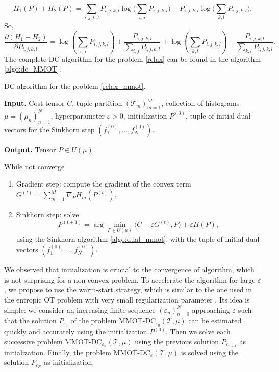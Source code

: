 \begin{equation*}
  H_1(P) + H_2(P) = \sum_{i,j,k,l} P_{i,j,k,l}
  \log\big( \sum_{i,j} P_{i,j,k,l} \big) + P_{i,j,k,l} \log\big( \sum_{k,l} P_{i,j,k,l} \big).
\end{equation*}
So,
\begin{equation*} \label{optim_condition}
  \frac{\partial (H_1 + H_2)}{\partial P_{i,j,k,l}} = \log \left( \sum_{i,j} P_{i,j,k,l} \right) +
  \frac{P_{i,j,k,l}}{\sum_{i,j} P_{i,j,k,l}} +
  \log \left( \sum_{k,l} P_{i,j,k,l} \right) + \frac{P_{i,j,k,l}}{\sum_{k,l} P_{i,j,k,l}}.
\end{equation*}
The complete DC algorithm for the problem \ref{relax} can be found in the algorithm \ref{algo:dc_MMOT}.
\begin{algorithm}[h]
  \caption{DC algorithm for the problem \ref{relax_mmot}.}
  \textbf{Input.} Cost tensor $C$, tuple partition $(\mathcal T_m)_{m=1}^M$, collection of histograms $\mu = (\mu_n)_{n=1}^N$,
  hyperparameter $\varepsilon > 0$, initialization $P^{(0)}$, tuple of initial dual vectors for the
  Sinkhorn step $(f_1^{(0)},...,f_N^{(0)})$.

  \textbf{Output.} Tensor $P \in U(\mu)$.

  While not converge
  \begin{enumerate}
    \item Gradient step: compute the gradient of the convex term $G^{(t)} = \sum\limits_{m=1}^M \nabla_P H_m(P^{(t)})$.
    \item Sinkhorn step: solve
    \begin{equation*}
      P^{(t+1)} = \arg\min_{P \in U(\mu)} \langle C - \varepsilon G^{(t)}, P \rangle + \varepsilon H(P),
    \end{equation*}
    using the Sinkhorn algorithm \ref{algo:dual_mmot}, with the tuple of initial dual vectors $(f_1^{(0)},...,f_N^{(0)})$.
  \end{enumerate}
  \label{algo:dc_MMOT}
\end{algorithm}
We observed that initialization is crucial to the convergence of algorithm, which
is not surprising for a non-convex problem. To accelerate the algorithm for large $\varepsilon$,
we propose to use the warm-start strategy, which is similar to the one used in the entropic OT problem with very
small regularization parameter \citep{Schmitzer19}. Its idea is simple: we consider an increasing finite sequence
$(\varepsilon_n)_{n=0}^N$ approaching $\varepsilon$ such that the solution $P_{\varepsilon_0}$ of the problem
$\text{MMOT-DC}_{\varepsilon_0}(\mathcal T, \mu)$ can be estimated quickly and accurately using the initialization $P^{(0)}$. Then we solve each
successive problem $\text{MMOT-DC}_{\varepsilon_n}(\mathcal T, \mu)$ using the previous solution $P_{\varepsilon_{n-1}}$ as initialization. Finally,
the problem $\text{MMOT-DC}_{\varepsilon}(\mathcal T, \mu)$ is solved using the solution $P_{\varepsilon_N}$ as initialization.

